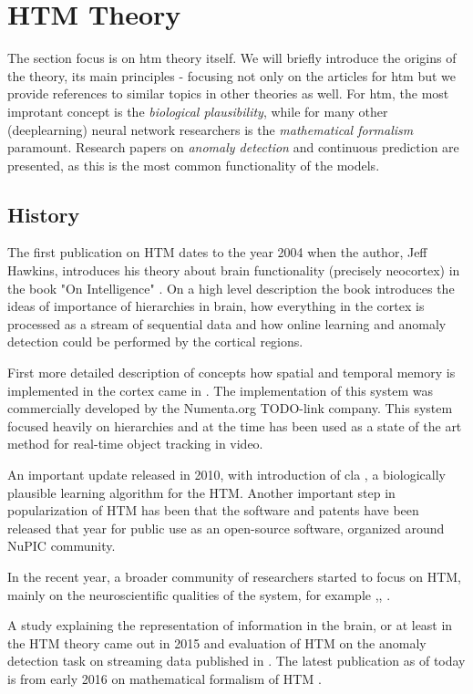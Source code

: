 \documentclass[a4,IEEEconf]{article}
\begin{document}
\section{HTM Theory}
The section focus is on \gls{htm} theory itself. We will briefly introduce the origins of the theory, its main principles - focusing not only on the articles for \gls{htm} but we provide references to similar topics in other theories as well. For \gls{htm}, the most improtant concept is the \textit{biological plausibility}, while for many other (deeplearning) neural network researchers is the \textit{mathematical formalism} paramount. Research papers on \textit{anomaly detection} and continuous prediction are presented, as this is the most common functionality of the models.  
\subsection{History}
The first publication on HTM dates to the year 2004 when the author, Jeff Hawkins, introduces his theory about brain functionality (precisely neocortex) in the book "On Intelligence" \cite{hawkins04}. On a high level description the book introduces the ideas of importance of hierarchies in brain, how everything in the cortex is processed as a stream of sequential data and how online learning and anomaly detection could be performed by the cortical regions. 

First more detailed description of concepts how spatial and temporal memory is implemented in the cortex came in \cite{HawkinsAndGeorge2006}. The implementation of this system was commercially developed by the Numenta.org TODO-link company. This system focused heavily on hierarchies and at the time has been used as a state of the art method for real-time object tracking in video. 

An important update released in 2010, with introduction of \gls{cla} \cite{Hawkins:2010}, a biologically plausible learning algorithm for the HTM. 
Another important step in popularization of HTM has been that the software and patents have been released that year for public use as an open-source software, organized around NuPIC community. 

In the recent year, a broader community of researchers started to focus on HTM, mainly on the neuroscientific qualities of the system, for example \cite{journals/corr/Ferrier14},\cite{journals/corr/Byrne15a}, \cite{journals/corr/HawkinsA15}. 

A study explaining the representation of information in the brain, or at least in the HTM theory came out in 2015 \cite{journals/corr/AhmadH15} and evaluation of HTM on the anomaly detection task on streaming data published in \cite{journals/corr/LavinA15}. The latest publication as of today is from early 2016 on mathematical formalism of HTM \cite{1601.06116v1}. 
\end{document}
